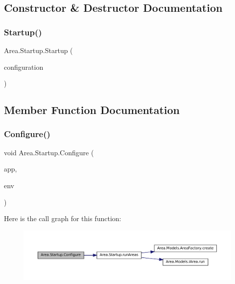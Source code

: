 \subsection{Constructor \& Destructor Documentation}
\mbox{\label{classArea_1_1Startup_a9446beab712dc1d1849faa142f6b15eb}} 
\subsubsection{\texorpdfstring{Startup()}{Startup()}}
{\footnotesize\ttfamily Area.\+Startup.\+Startup (\begin{DoxyParamCaption}\item[{I\+Configuration}]{configuration }\end{DoxyParamCaption})\hspace{0.3cm}{\ttfamily [inline]}}



\subsection{Member Function Documentation}
\mbox{\label{classArea_1_1Startup_ae1c770b597465dbc651f78efbebb0211}} 
\subsubsection{\texorpdfstring{Configure()}{Configure()}}
{\footnotesize\ttfamily void Area.\+Startup.\+Configure (\begin{DoxyParamCaption}\item[{I\+Application\+Builder}]{app,  }\item[{I\+Hosting\+Environment}]{env }\end{DoxyParamCaption})\hspace{0.3cm}{\ttfamily [inline]}}

Here is the call graph for this function\+:
\nopagebreak
\begin{figure}[H]
\begin{center}
\leavevmode
\includegraphics[width=350pt]{classArea_1_1Startup_ae1c770b597465dbc651f78efbebb0211_cgraph}
\end{center}
\end{figure}
\mbox{\label{classArea_1_1Startup_a590ff5828dfd2beeb8839b0cf54c8e49}} 
